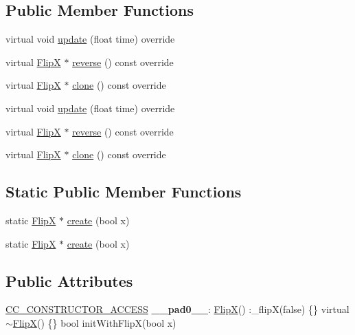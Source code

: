 \subsection*{Public Member Functions}
\begin{DoxyCompactItemize}
\item 
virtual void \hyperlink{classFlipX_ac83f96bee0cebd14b4d06813bd259047}{update} (float time) override
\item 
virtual \hyperlink{classFlipX}{FlipX} $\ast$ \hyperlink{classFlipX_af626c89fa9e3c2881fe52a48eecef17d}{reverse} () const override
\item 
virtual \hyperlink{classFlipX}{FlipX} $\ast$ \hyperlink{classFlipX_aa610da08d03c31d45ceceb5bb0795719}{clone} () const override
\item 
virtual void \hyperlink{classFlipX_a7722cb20061b1e1708581585a1e2f1b3}{update} (float time) override
\item 
virtual \hyperlink{classFlipX}{FlipX} $\ast$ \hyperlink{classFlipX_a73b5cd89de0852721c49506eb02046ba}{reverse} () const override
\item 
virtual \hyperlink{classFlipX}{FlipX} $\ast$ \hyperlink{classFlipX_a66d81c1b3dfced40fad2cc6557de72ec}{clone} () const override
\end{DoxyCompactItemize}
\subsection*{Static Public Member Functions}
\begin{DoxyCompactItemize}
\item 
static \hyperlink{classFlipX}{FlipX} $\ast$ \hyperlink{classFlipX_a69e09dd858edb74128bdc4b5716de2f7}{create} (bool x)
\item 
static \hyperlink{classFlipX}{FlipX} $\ast$ \hyperlink{classFlipX_a94a9de71315781e0742fd403626646e9}{create} (bool x)
\end{DoxyCompactItemize}
\subsection*{Public Attributes}
\begin{DoxyCompactItemize}
\item 
\mbox{\label{classFlipX_acc841e8f31fa6d1cc555530dc95494aa}} 
\hyperlink{_2cocos2d_2cocos_2base_2ccConfig_8h_a25ef1314f97c35a2ed3d029b0ead6da0}{C\+C\+\_\+\+C\+O\+N\+S\+T\+R\+U\+C\+T\+O\+R\+\_\+\+A\+C\+C\+E\+SS} {\bfseries \+\_\+\+\_\+pad0\+\_\+\+\_\+}\+: \hyperlink{classFlipX}{FlipX}() \+:\+\_\+flipX(false) \{\} virtual $\sim$\hyperlink{classFlipX}{FlipX}() \{\} bool init\+With\+FlipX(bool x)
\end{DoxyCompactItemize}

